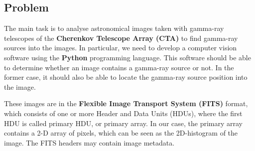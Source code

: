 \documentclass[a4paper,12pt,oneside]{book}
\begin{document}
\begin{onehalfspace}

    \chapter{Problem}
    
    The main task is to analyse astronomical images taken with gamma-ray telescopes of the \textbf{Cherenkov Telescope Array (CTA)} to find gamma-ray sources into the images. 
    In particular, we need to develop a computer vision software using the \textbf{Python} programming language. This software should be able to determine whether an image contains a gamma-ray source or not. In the former case, it should also be able to locate the gamma-ray source position into the image.
    
    These images are in the \textbf{Flexible Image Transport System (FITS)} format, which consists of one or more Header and Data Units (HDUs), where the first HDU is called primary HDU, or primary array. In our case, the primary array contains a 2-D array of pixels, which can be seen as the 2D-histogram of the image. The FITS headers may contain image metadata. 
    

\end{onehalfspace}
\end{document}
